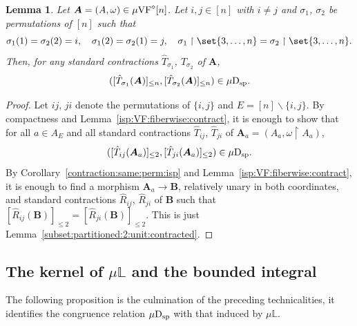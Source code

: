 \documentclass[12pt]{amsart}
\theoremstyle{plain}
\newtheorem{lem}[thm]{Lemma}
\theoremstyle{definition}
\theoremstyle{remark}
\numberwithin{equation}{section}
\theoremstyle{plain}
\newcommand{\VF}{\textup{VF}}
\newcommand{\0}{\emptyset}
\newcommand{\bb}[1]{\mathbb{#1}}
\newcommand{\rest}{\upharpoonright}
\newcommand{\fun}{\longrightarrow}
\newcommand{\mi}{\smallsetminus}
\newcommand{\mVF}{{\mu}{\VF}}
\newcommand{\dsp}{\textup{D}_{\textup{sp}}}
\newcommand{\mispdb}{\mu \dsp}
\newcommand{\mL}{{\mu}{\bb L}}
\begin{document}
\begin{lem}\label{contraction:perm:pair:isp}
Let $\bm A = (A, \omega) \in \mVF^\diamond[n]$. Let $i, j \in [n]$ with $i \neq j$ and $\sigma_1$, $\sigma_2$ be  permutations of $[n]$ such that
\[
\sigma_1(1) = \sigma_2(2) = i, \quad \sigma_1(2) = \sigma_2(1) = j, \quad \sigma_1
\rest \set{3, \ldots, n} = \sigma_2 \rest \set{3, \ldots, n}.
\]
Then, for any standard contractions $\hat T_{\sigma_1}$, $\hat T_{\sigma_2}$ of $\bm A$,
\[
([\hat T_{\sigma_1}(\bm A)]_{\leq n}, [\hat T_{\sigma_2}(\bm A)]_{\leq n}) \in \mispdb.
\]
\end{lem}
\begin{proof}
Let $ij$, $ji$ denote the permutations of $\{i, j\}$ and $E = [n] \mi \{i, j\}$. By compactness and
Lemma~\ref{isp:VF:fiberwise:contract}, it is enough to show
that for  all $a \in A_E$ and all standard
contractions $\hat T_{ij}$, $\hat T_{ji}$ of $\bm A_a = (A_a, \omega \rest A_a)$,
\[
([\hat T_{ij}(\bm A_a)]_{\leq 2}, [\hat T_{ji}(\bm A_a)]_{\leq 2})
\in \mispdb.
\]
By Corollary~\ref{contraction:same:perm:isp} and Lemma~\ref{isp:VF:fiberwise:contract}, it is enough to find a morphism $\bm A_a \fun \bm B$, relatively unary in both coordinates, and  standard contractions $\hat R_{ij}$, $\hat R_{ji}$ of $\bm B$ such that $[\hat R_{ij}(\bm B)]_{\leq 2} = [\hat R_{ji}(\bm B)]_{\leq 2}$. This is just Lemma~\ref{subset:partitioned:2:unit:contracted}.
\end{proof}

\subsection{The kernel of $\mL$ and the bounded integral}

The following proposition is the culmination of the preceding technicalities, it identifies the
congruence relation  $\mispdb$ with that induced by
$\mL$.
\end{document}

